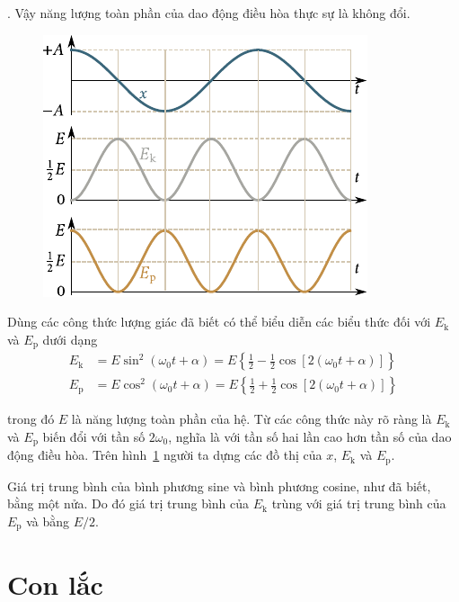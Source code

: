 . Vậy năng lượng toàn phần của dao động điều hòa thực sự là không đổi.

\begin{figure}[!htb]
	\begin{center}
		\includegraphics[scale=0.95]{figures/ch_07/fig_7_6.pdf}
		\caption[]{}
		\label{fig:7_6}
	\end{center}
\end{figure}

Dùng các công thức lượng giác đã biết có thể biểu diễn các biểu thức đối với $E_{\text{k}}$ và $E_{\text{p}}$ dưới dạng
\begin{align}
	E_{\text{k}} &= E\sin^2(\omega_0 t + \alpha) = E \left\{\frac{1}{2} - \frac{1}{2}\cos[2(\omega_0 t + \alpha)]\right\}\label{eq:7_69}\\
	E_{\text{p}} &= E\cos^2(\omega_0 t + \alpha) = E \left\{\frac{1}{2} + \frac{1}{2}\cos[2(\omega_0 t + \alpha)]\right\}\label{eq:7_70}
\end{align}

\noindent
trong đó $E$ là năng lượng toàn phần của hệ. Từ các công thức này rõ ràng là $E_{\text{k}}$ và $E_{\text{p}}$ biến đổi với tần số $2\omega_0$, nghĩa là với tần số hai lần cao hơn tần số của dao động điều hòa. Trên hình~\ref{fig:7_6} người ta dựng các đồ thị của $x$, $E_{\text{k}}$ và $E_{\text{p}}$.



Giá trị trung bình của bình phương sine và bình phương cosine, như đã biết, bằng một nửa. Do đó giá trị trung bình của $E_{\text{k}}$ trùng với giá trị trung bình của $E_{\text{p}}$ và bằng $E/2$.

\section{Con lắc}\label{sec:7_6}

